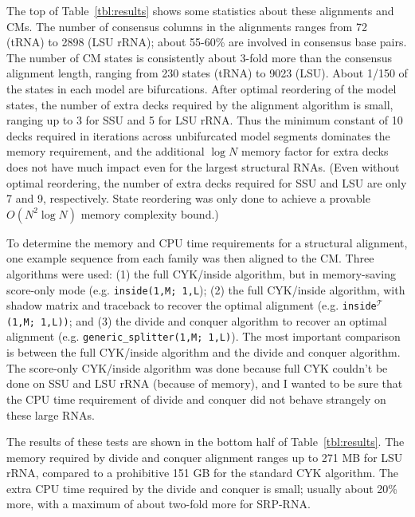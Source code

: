 \documentclass[11pt]{article}
\begin{document}
The top of Table~\ref{tbl:results} shows some statistics about these
alignments and CMs. The number of consensus columns in the alignments
ranges from 72 (tRNA) to 2898 (LSU rRNA); about 55-60\% are involved
in consensus base pairs. The number of CM states is consistently about
3-fold more than the consensus alignment length, ranging from 230
states (tRNA) to 9023 (LSU). About 1/150 of the states in each model
are bifurcations. After optimal reordering of the model states, the
number of extra decks required by the alignment algorithm is small,
ranging up to 3 for SSU and 5 for LSU rRNA. Thus the minimum constant
of 10 decks required in iterations across unbifurcated model segments
dominates the memory requirement, and the additional $\log N$ memory
factor for extra decks does not have much impact even for the largest
structural RNAs. (Even without optimal reordering, the number of extra
decks required for SSU and LSU are only 7 and 9, respectively. State
reordering was only done to achieve a provable $O(N^2\log N)$ memory
complexity bound.)

To determine the memory and CPU time requirements for a structural
alignment, one example sequence from each family was then aligned to
the CM.  Three algorithms were used: (1) the full CYK/inside
algorithm, but in memory-saving score-only mode
(e.g. \texttt{inside(1,M; 1,L}); (2) the full CYK/inside algorithm,
with shadow matrix and traceback to recover the optimal alignment
(e.g. \texttt{inside}$^\mathcal{T}$\texttt{(1,M; 1,L))}; and (3) the
divide and conquer algorithm to recover an optimal alignment
(e.g. \texttt{generic\_splitter(1,M; 1,L)}). The most important
comparison is between the full CYK/inside algorithm and the divide and
conquer algorithm. The score-only CYK/inside algorithm was done
because full CYK couldn't be done on SSU and LSU rRNA (because of
memory), and I wanted to be sure that the CPU time requirement of
divide and conquer did not behave strangely on these large RNAs.

The results of these tests are shown in the bottom half of
Table~\ref{tbl:results}. The memory required by divide and conquer
alignment ranges up to 271 MB for LSU rRNA, compared to a prohibitive
151 GB for the standard CYK algorithm. The extra CPU time required by
the divide and conquer is small; usually about 20\% more, with a
maximum of about two-fold more for SRP-RNA.
\end{document}
